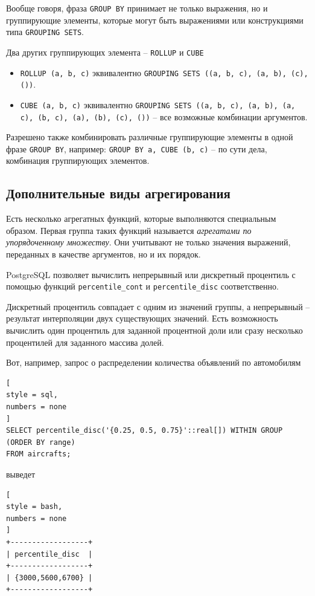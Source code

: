\documentclass[%
	11pt,
	a4paper,
	utf8,
		]{article}
\begin{document}
Вообще говоря, фраза \texttt{GROUP BY} принимает не только выражения, но и группирующие элементы, которые могут быть выражениями или конструкциями типа \texttt{GROUPING SETS}.

Два других группирующих элемента -- \texttt{ROLLUP} и \texttt{CUBE}
\begin{itemize}
	\item \texttt{ROLLUP (a, b, c)} эквивалентно \texttt{GROUPING SETS ((a, b, c), (a, b), (c), ())}.
	
	\item \texttt{CUBE (a, b, c)} эквивалентно \texttt{GROUPING SETS ((a, b, c), (a, b), (a, c), (b, c), (a), (b), (c), ())} -- все возможные комбинации аргументов.
\end{itemize}

Разрешено также комбинировать различные группирующие элементы в одной фразе \texttt{GROUP BY}, например: \texttt{GROUP BY a, CUBE (b, c)} -- по сути дела, комбинация группирующих элементов.

\subsection{Дополнительные виды агрегирования}

Есть несколько агрегатных функций, которые выполняются специальным образом. Первая группа таких функций называется \textit{агрегатами по упорядоченному множеству}. Они учитывают не только значения выражений, переданных в качестве аргументов, но и их порядок.

PostgreSQL позволяет вычислить непрерывный или дискретный процентиль с помощью функций \texttt{percentile\_cont} и \texttt{percentile\_disc} соответственно.

Дискретный процентиль совпадает с одним из значений группы, а непрерывный -- результат интерполяции двух существующих значений. Есть возможность вычислить один процентиль для заданной процентной доли или сразу несколько процентилей для заданного массива долей.

Вот, например, запрос о распределении количества объявлений по автомобилям
\begin{lstlisting}[
style = sql,
numbers = none
]
SELECT percentile_disc('{0.25, 0.5, 0.75}'::real[]) WITHIN GROUP (ORDER BY range)
FROM aircrafts;
\end{lstlisting}
выведет
\begin{lstlisting}[
style = bash,
numbers = none
]
+------------------+
| percentile_disc  |
+------------------+
| {3000,5600,6700} |
+------------------+
\end{lstlisting}
\end{document}
